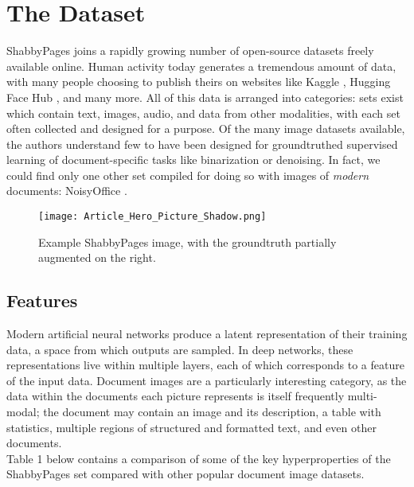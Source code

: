 \documentclass[runningheads]{llncs}
\begin{document}
\section{The Dataset}
ShabbyPages joins a rapidly growing number of open-source datasets freely available online. Human activity today generates a tremendous amount of data, with many people choosing to publish theirs on websites like Kaggle \cite{ref_Kaggle}, Hugging Face Hub \cite{ref_HuggingFaceHub}, and many more. All of this data is arranged into categories: sets exist which contain text, images, audio, and data from other modalities, with each set often collected and designed for a purpose. Of the many image datasets available, the authors understand few to have been designed for groundtruthed supervised learning of document-specific tasks like binarization or denoising. In fact, we could find only one other set compiled for doing so with images of \textit{modern} documents: NoisyOffice \cite{ref_NoisyOffice}.

\begin{figure}
\texttt{[image: Article\_Hero\_Picture\_Shadow.png]}
\caption{Example ShabbyPages image, with the groundtruth partially augmented on the right.} \label{fig1}
\end{figure}

\subsection{Features}
Modern artificial neural networks produce a latent representation of their training data, a space from which outputs are sampled. In deep networks, these representations live within multiple layers, each of which corresponds to a feature of the input data. Document images are a particularly interesting category, as the data within the documents each picture represents is itself frequently multi-modal; the document may contain an image and its description, a table with statistics, multiple regions of structured and formatted text, and even other documents.\\

Table 1 below contains a comparison of some of the key hyperproperties of the ShabbyPages set compared with other popular document image datasets.
\end{document}
